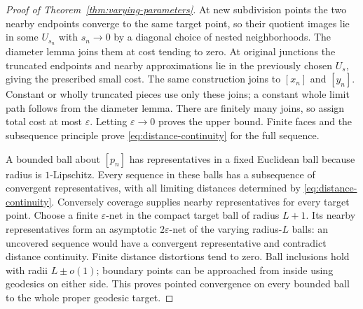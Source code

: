 \begin{proof}[Proof of Theorem~\ref{thm:varying-parameters}]
At new subdivision points the two nearby endpoints converge to
the same target point, so their quotient images lie in some
$U_{s_n}$ with $s_n\to0$ by a diagonal choice of nested neighborhoods.
The diameter lemma joins them at cost tending to zero.
At original junctions the truncated endpoints and nearby
approximations lie in the previously chosen $U_s$, giving the
prescribed small cost. The same construction joins to $[x_n]$
and $[y_n]$. Constant or wholly truncated pieces use only these
joins; a constant whole limit path follows from the diameter lemma.
There are finitely many joins, so assign total cost at most
$\varepsilon$. Letting $\varepsilon\to0$ proves the upper bound.
Finite faces and the subsequence principle prove
\eqref{eq:distance-continuity} for the full sequence.

A bounded ball about $[p_n]$ has representatives in a fixed
Euclidean ball because radius is $1$-Lipschitz.
Every sequence in these balls has a subsequence of convergent
representatives, with all limiting distances determined by
\eqref{eq:distance-continuity}. Conversely coverage supplies
nearby representatives for every target point.
Choose a finite $\varepsilon$-net in the compact target ball
of radius $L+1$. Its nearby representatives form an asymptotic
$2\varepsilon$-net of the varying radius-$L$ balls: an uncovered
sequence would have a convergent representative and contradict
distance continuity. Finite distance distortions tend to zero.
Ball inclusions hold with radii $L\pm o(1)$; boundary points can
be approached from inside using geodesics on either side.
This proves pointed convergence on every bounded ball to the
whole proper geodesic target.
\end{proof}

